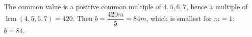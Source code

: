 The common value is a positive common multiple of $4,5,6,7$, hence a multiple of $\operatorname{lcm}(4,5,6,7)=420$. Then $b=\dfrac{420m}{5}=84m$, which is smallest for $m=1$: $b=\boxed{84}$.
